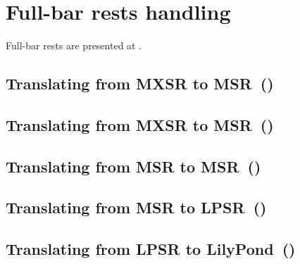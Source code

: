 



\chapter{Full-bar rests handling}\label{Full-bar rests handling}

Full-bar rests are presented at .


\section{Translating from MXSR to MSR\ (\mxsrToMsr{})}


\section{Translating from MXSR to MSR\ (\mxsrToMsr{})}


\section{Translating from MSR to MSR\ (\msrToMsr{})}


\section{Translating from MSR to LPSR\ (\msrToLpsr{})}


\section{Translating from LPSR to LilyPond\ (\lpsrToLilypond{})}


